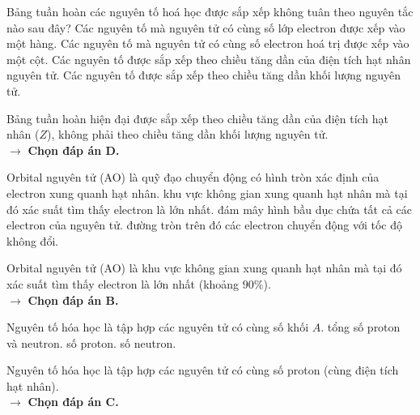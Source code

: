 \documentclass[11pt,a4paper]{article}
\begin{document}
\begin{ex}%
Bảng tuần hoàn các nguyên tố hoá học được sắp xếp không tuân theo nguyên tắc nào sau đây?
\choice
{Các nguyên tố mà nguyên tử có cùng số lớp electron được xếp vào một hàng.}
{Các nguyên tố mà nguyên tử có cùng số electron hoá trị được xếp vào một cột.}
{Các nguyên tố được sắp xếp theo chiều tăng dần của điện tích hạt nhân nguyên tử.}
{\True Các nguyên tố được sắp xếp theo chiều tăng dần khối lượng nguyên tử.}
\begin{loigiai}
Bảng tuần hoàn hiện đại được sắp xếp theo chiều tăng dần của điện tích hạt nhân ($Z$), không phải theo chiều tăng dần khối lượng nguyên tử.\\
$\rightarrow$ \textbf{Chọn đáp án D.}
\end{loigiai}
\end{ex}

\begin{ex}%
Orbital nguyên tử (AO) là
\choice
{quỹ đạo chuyển động có hình tròn xác định của electron xung quanh hạt nhân.}
{\True khu vực không gian xung quanh hạt nhân mà tại đó xác suất tìm thấy electron là lớn nhất.}
{đám mây hình bầu dục chứa tất cả các electron của nguyên tử.}
{đường tròn trên đó các electron chuyển động với tốc độ không đổi.}
\begin{loigiai}
Orbital nguyên tử (AO) là khu vực không gian xung quanh hạt nhân mà tại đó xác suất tìm thấy electron là lớn nhất (khoảng $90\%$).\\
$\rightarrow$ \textbf{Chọn đáp án B.}
\end{loigiai}
\end{ex}

\begin{ex}%
Nguyên tố hóa học là tập hợp các nguyên tử có cùng
\choice
{số khối $A$.}
{tổng số proton và neutron.}
{\True số proton.}
{số neutron.}
\begin{loigiai}
Nguyên tố hóa học là tập hợp các nguyên tử có cùng số proton (cùng điện tích hạt nhân).\\
$\rightarrow$ \textbf{Chọn đáp án C.}
\end{loigiai}
\end{ex}
\end{document}
